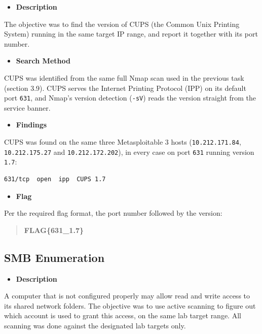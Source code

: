 \documentclass[11pt]{article}
\begin{document}
\begin{itemize}[leftmargin=1.5em]
    \item \textbf{Description}
\end{itemize}
\noindent The objective was to find the version of CUPS (the Common Unix Printing System) running in the same target IP range, and report it together with its port number.

\begin{itemize}[leftmargin=1.5em]
    \item \textbf{Search Method}
\end{itemize}
\noindent CUPS was identified from the same full Nmap scan used in the previous task (section 3.9). CUPS serves the Internet Printing Protocol (IPP) on its default port \texttt{631}, and Nmap's version detection (\texttt{-sV}) reads the version straight from the service banner.

\begin{itemize}[leftmargin=1.5em]
    \item \textbf{Findings}
\end{itemize}
\noindent CUPS was found on the same three Metasploitable 3 hosts (\texttt{10.212.171.84}, \texttt{10.212.175.27} and \texttt{10.212.172.202}), in every case on port \texttt{631} running version \texttt{1.7}:

\begin{verbatim}
631/tcp  open  ipp  CUPS 1.7
\end{verbatim}

\begin{itemize}[leftmargin=1.5em]
    \item \textbf{Flag}
\end{itemize}
\noindent Per the required flag format, the port number followed by the version:

\begin{quote}
\textbf{FLAG\{631\_1.7\}}
\end{quote}

\subsection{SMB Enumeration}

\begin{itemize}[leftmargin=1.5em]
    \item \textbf{Description}
\end{itemize}
\noindent A computer that is not configured properly may allow read and write access to its shared network folders. The objective was to use active scanning to figure out which account is used to grant this access, on the same lab target range. All scanning was done against the designated lab targets only.
\end{document}
